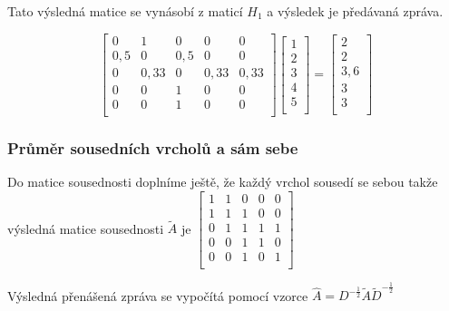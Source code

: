 Tato výsledná matice se vynásobí z maticí $H_1$ a výsledek je předávaná zpráva.

\[
\left[ \begin{matrix}
0 & 1 & 0 & 0 & 0 \\
0,5 & 0 & 0,5 & 0 & 0 \\
0 & 0,33 & 0 & 0,33 & 0,33 \\
0 & 0 & 1 & 0 & 0 \\
0 & 0 & 1 & 0 & 0 \\
\end{matrix} \right]
\left[ \begin{matrix}
1 \\
2 \\
3 \\
4 \\
5 \\
\end{matrix} \right] = 
\left[ \begin{matrix}
2 \\
2 \\
3,6 \\
3 \\
3 \\
\end{matrix} \right] 
\]

\subsubsection{Průměr sousedních vrcholů a sám sebe}

Do matice sousednosti doplníme ještě, že každý vrchol sousedí se sebou takže výsledná matice sousednosti $\tilde{A}$ je
$\left[ \begin{matrix}
1 & 1 & 0 & 0 & 0 \\
1 & 1 & 1 & 0 & 0 \\
0 & 1 & 1 & 1 & 1 \\
0 & 0 & 1 & 1 & 0 \\
0 & 0 & 1 & 0 & 1 \\
\end{matrix} \right]$ 

Výsledná přenášená zpráva se vypočítá pomocí vzorce $\hat{A} = D^{-\frac{1}{2}}\tilde{A}\tilde{D}^{-\frac{1}{2}}$
